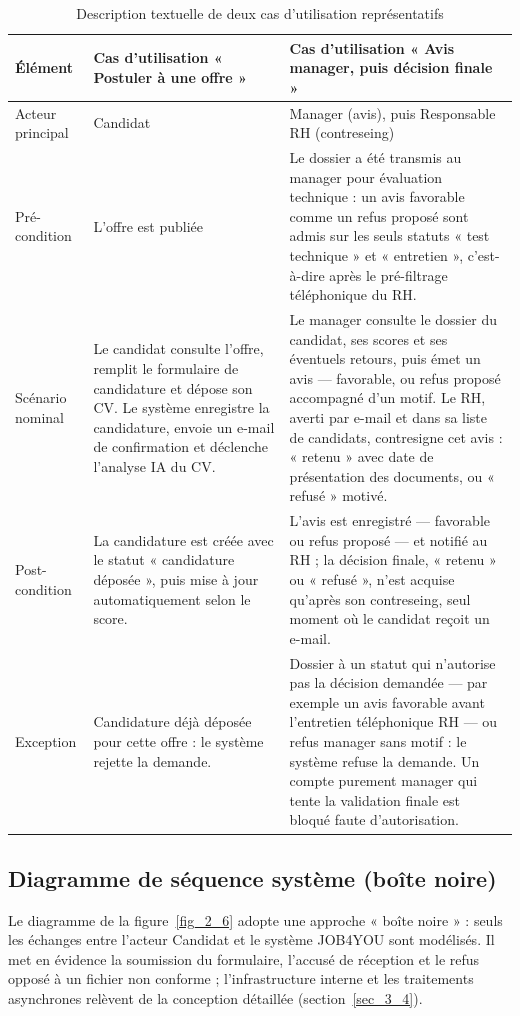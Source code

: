 \documentclass[]{./tpl/isipfe}
\begin{document}
\setcounter{table}{1}
\begin{table}[!ht]
\centering
\caption{Description textuelle de deux cas d’utilisation représentatifs}
\label{tab_2_2}
\renewcommand{\arraystretch}{1.25}\footnotesize
\setlength{\tabcolsep}{4pt}%
\begin{tabular}{|P{0.137\textwidth}|P{0.271\textwidth}|P{0.538\textwidth}|}
\hline
\textbf{Élément} & \textbf{Cas d’utilisation « Postuler à une offre »} & \textbf{Cas d’utilisation « Avis manager, puis décision finale »} \\
\hline
Acteur principal & Candidat & Manager (avis), puis Responsable RH (contreseing) \\
\hline
Pré-condition & L’offre est publiée & Le dossier a été transmis au manager pour évaluation technique : un avis favorable comme un refus proposé sont admis sur les seuls statuts « test technique » et « entretien », c’est-à-dire après le pré-filtrage téléphonique du RH. \\
\hline
Scénario nominal & Le candidat consulte l’offre, remplit le formulaire de candidature et dépose son CV. Le système enregistre la candidature, envoie un e-mail de confirmation et déclenche l’analyse IA du CV. & Le manager consulte le dossier du candidat, ses scores et ses éventuels retours, puis émet un avis — favorable, ou refus proposé accompagné d’un motif. Le RH, averti par e-mail et dans sa liste de candidats, contresigne cet avis : « retenu » avec date de présentation des documents, ou « refusé » motivé. \\
\hline
Post-condition & La candidature est créée avec le statut « candidature déposée », puis mise à jour automatiquement selon le score. & L’avis est enregistré — favorable ou refus proposé — et notifié au RH ; la décision finale, « retenu » ou « refusé », n’est acquise qu’après son contreseing, seul moment où le candidat reçoit un e-mail. \\
\hline
Exception & Candidature déjà déposée pour cette offre : le système rejette la demande. & Dossier à un statut qui n’autorise pas la décision demandée — par exemple un avis favorable avant l’entretien téléphonique RH — ou refus manager sans motif : le système refuse la demande. Un compte purement manager qui tente la validation finale est bloqué faute d’autorisation. \\
\hline
\end{tabular}
\end{table}
\subsection{Diagramme de séquence système (boîte noire)}
\label{sec_2_2_7}
Le diagramme de la figure~\ref{fig_2_6} adopte une approche « boîte noire » : seuls les échanges entre l’acteur Candidat et le système JOB4YOU sont modélisés. Il met en évidence la soumission du formulaire, l’accusé de réception et le refus opposé à un fichier non conforme ; l’infrastructure interne et les traitements asynchrones relèvent de la conception détaillée (section~\ref{sec_3_4}).
\end{document}
